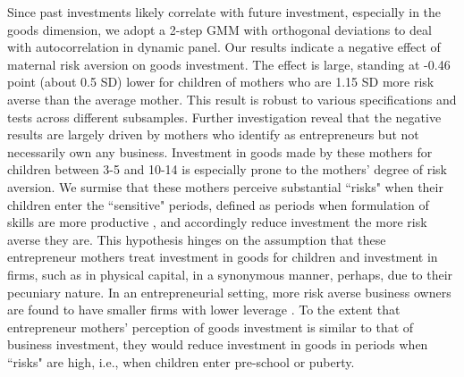 \documentclass[emulatestandardclasses, 10pt, abstract = true]{scrartcl}
\begin{document}
Since past investments likely correlate with future investment, especially in the goods dimension, we adopt a 2-step GMM \citep{arellano1991some, blundell1998initial} with orthogonal deviations \citep{arellano1995another} to deal with autocorrelation in dynamic panel. Our results indicate a negative effect of maternal risk aversion on goods investment. The effect is large, standing at -0.46 point (about 0.5 SD) lower for children of mothers who are 1.15 SD more risk averse than the average mother. This result is robust to various specifications and tests across different subsamples. Further investigation reveal that the negative results are largely driven by mothers who identify as entrepreneurs but not necessarily own any business. Investment in goods made by these mothers for children between 3-5 and 10-14 is especially prone to the mothers' degree of risk aversion. We surmise that these mothers perceive substantial ``risks" when their children enter the ``sensitive" periods, defined as periods when formulation of skills are more productive \citep{knudsen2006economic, cunha2007technology}, and accordingly reduce investment the more risk averse they are. This hypothesis hinges on the assumption that these entrepreneur mothers treat investment in goods for children and investment in firms, such as in physical capital, in a synonymous manner, perhaps, due to their pecuniary nature. In an entrepreneurial setting, more risk averse business owners are found to have smaller firms with lower leverage \citep{herranz2015entrepreneurs}. To the extent that entrepreneur mothers' perception of goods investment is similar to that of business investment, they would reduce investment in goods in periods when ``risks" are high, i.e., when children enter pre-school or puberty.  
\end{document}
